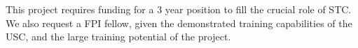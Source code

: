 %
%
%
%
%

This project requires funding for a 3 year position to fill the crucial role of STC. 
%
%    
%
We also request a FPI fellow, given the demonstrated training capabilities of the USC, and the large training potential of the project.